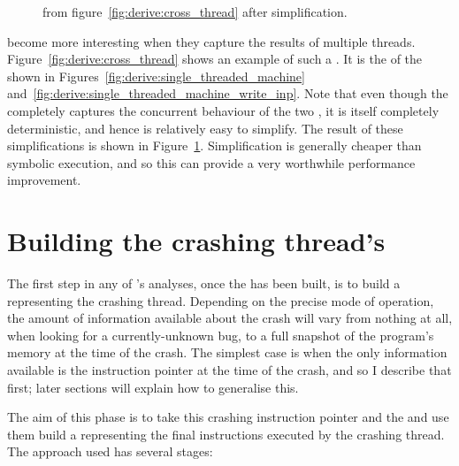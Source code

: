 \begin{figure}
  \caption{{\STateMachine} from figure~\ref{fig:derive:cross_thread}
    after {\StateMachine} simplification.}
  \label{fig:derive:cross_thread_opt}
\end{figure}

{\STateMachines} become more interesting when they capture the results
of multiple threads.  Figure~\ref{fig:derive:cross_thread} shows an
example of such a {\StateMachine}.  It is the
 of the {\StateMachines} shown in
Figures~\ref{fig:derive:single_threaded_machine}
and~\ref{fig:derive:single_threaded_machine_write_inp}.  Note that
even though the {\StateMachine} completely captures the concurrent
behaviour of the two {\StateMachines}, it is itself completely
deterministic, and hence is relatively easy to simplify.  The result
of these simplifications is shown in
Figure~\ref{fig:derive:cross_thread_opt}.  Simplification is generally
cheaper than symbolic execution, and so this can provide a very
worthwhile performance improvement.

\section{Building the crashing thread's \StateMachine}

The first step in any of {\Technique}'s analyses, once the
 has been built, is to build a {\StateMachine}
representing the crashing thread.  Depending on the precise mode of
operation, the amount of information available about the crash will
vary from nothing at all, when looking for a currently-unknown bug, to
a full snapshot of the program's memory at the time of the crash.  The
simplest case is when the only information available is the
instruction pointer at the time of the crash, and so I describe that
first; later sections will explain how to generalise this.

The aim of this phase is to take this crashing instruction pointer and
the  and use them build a {\StateMachine}
representing the final \backref{$\alpha$} instructions executed by the
crashing thread.  The approach used has several stages:

